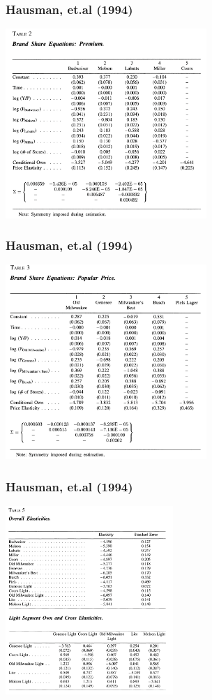 \documentclass[xcolor=pdftex,dvipsnames,table,mathserif,aspectratio=169]{beamer}
\begin{document}
\begin{frame}
\frametitle{Hausman, et.al (1994)}
\begin{center}
\includegraphics[width=3in]{resources/beer2.png}
\end{center}
\end{frame}

\begin{frame}
\frametitle{Hausman, et.al (1994)}
\begin{center}
\includegraphics[width=3in]{resources/beer3.png}
\end{center}
\end{frame}

\begin{frame}
\frametitle{Hausman, et.al (1994)}
\begin{center}
\includegraphics[width=2.5in]{resources/beer5.png}
\end{center}
\end{frame}
\end{document}
